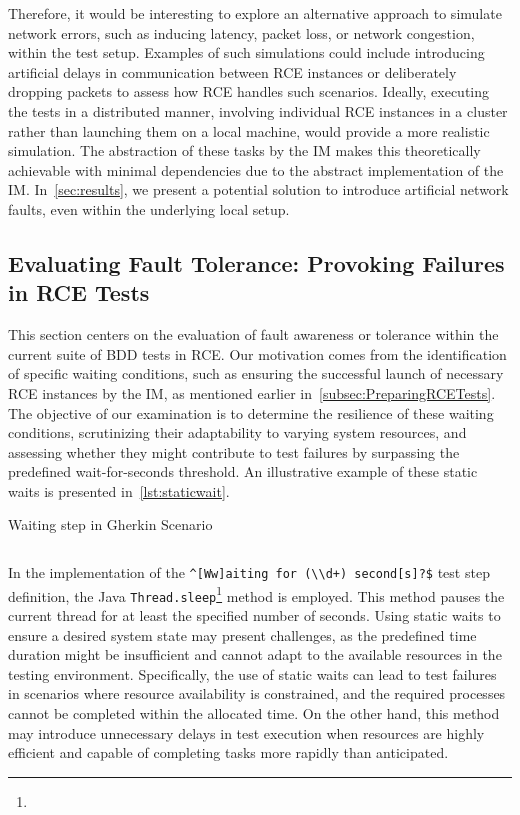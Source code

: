 Therefore, it would be interesting to explore an alternative approach to simulate network errors, such as inducing latency, packet loss, or network congestion, within the test setup. Examples of such simulations could include introducing artificial delays in communication between \ac{RCE} instances or deliberately dropping packets to assess how \ac{RCE} handles such scenarios. Ideally, executing the tests in a distributed manner, involving individual \ac{RCE} instances in a cluster rather than launching them on a local machine, would provide a more realistic simulation. The abstraction of these tasks by the \ac{IM} makes this theoretically achievable with minimal dependencies due to the abstract implementation of the \ac{IM}. In~\cref{sec:results}, we present a potential solution to introduce artificial network faults, even within the underlying local setup.

\subsection{Evaluating Fault Tolerance: Provoking Failures in \ac{RCE} Tests}
\label{subsec:staticwaits}
This section centers on the evaluation of fault awareness or tolerance within the current suite of \ac{BDD} tests in \ac{RCE}. Our motivation comes from the identification of specific waiting conditions, such as ensuring the successful launch of necessary RCE instances by the \ac{IM}, as mentioned earlier in~\cref{subsec:PreparingRCETests}. The objective of our examination is to determine the resilience of these waiting conditions, scrutinizing their adaptability to varying system resources, and assessing whether they might contribute to test failures by surpassing the predefined wait-for-seconds threshold. An illustrative example of these static waits is presented in~\cref{lst:staticwait}.

\begin{listing}[!ht]
\caption{Waiting step in Gherkin Scenario}
\label{lst:staticwait}
\inputminted{gherkin}{files/code/staticwait.feature}
\end{listing}

In the implementation of the \verb|^[Ww]aiting for (\\d+) second[s]?$| test step definition, the Java \texttt{Thread.sleep}\footnote{} method is employed. This method pauses the current thread for at least the specified number of seconds. Using static waits to ensure a desired system state may present challenges, as the predefined time duration might be insufficient and cannot adapt to the available resources in the testing environment. Specifically, the use of static waits can lead to test failures in scenarios where resource availability is constrained, and the required processes cannot be completed within the allocated time. On the other hand, this method may introduce unnecessary delays in test execution when resources are highly efficient and capable of completing tasks more rapidly than anticipated.

